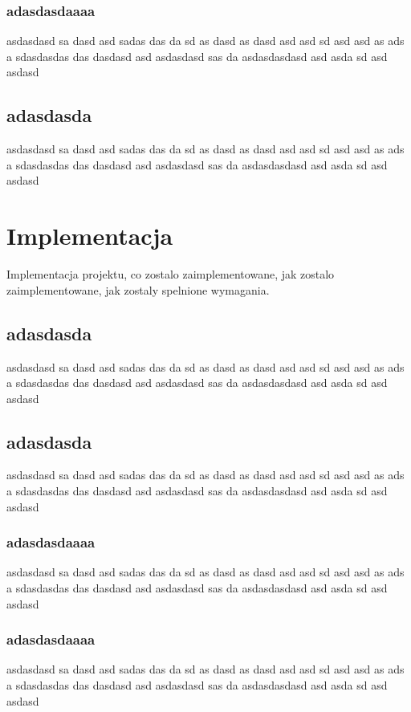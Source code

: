 \documentclass[14pt]{article}
\begin{document}
\subsubsection{adasdasdaaaa}
asdasdasd sa dasd asd sadas das da sd as dasd as dasd asd asd sd asd asd as ads a sdasdasdas das dasdasd asd asdasdasd sas da asdasdasdasd asd asda sd asd asdasd

\subsection{adasdasda}
asdasdasd sa dasd asd sadas das da sd as dasd as dasd asd asd sd asd asd as ads a sdasdasdas das dasdasd asd asdasdasd sas da asdasdasdasd asd asda sd asd asdasd

\section{Implementacja}

Implementacja projektu, co zostalo zaimplementowane, jak zostalo zaimplementowane, jak zostaly spelnione wymagania.

\subsection{adasdasda}
asdasdasd sa dasd asd sadas das da sd as dasd as dasd asd asd sd asd asd as ads a sdasdasdas das dasdasd asd asdasdasd sas da asdasdasdasd asd asda sd asd asdasd

\subsection{adasdasda}
asdasdasd sa dasd asd sadas das da sd as dasd as dasd asd asd sd asd asd as ads a sdasdasdas das dasdasd asd asdasdasd sas da asdasdasdasd asd asda sd asd asdasd

\subsubsection{adasdasdaaaa}
asdasdasd sa dasd asd sadas das da sd as dasd as dasd asd asd sd asd asd as ads a sdasdasdas das dasdasd asd asdasdasd sas da asdasdasdasd asd asda sd asd asdasd

\subsubsection{adasdasdaaaa}
asdasdasd sa dasd asd sadas das da sd as dasd as dasd asd asd sd asd asd as ads a sdasdasdas das dasdasd asd asdasdasd sas da asdasdasdasd asd asda sd asd asdasd
\end{document}

